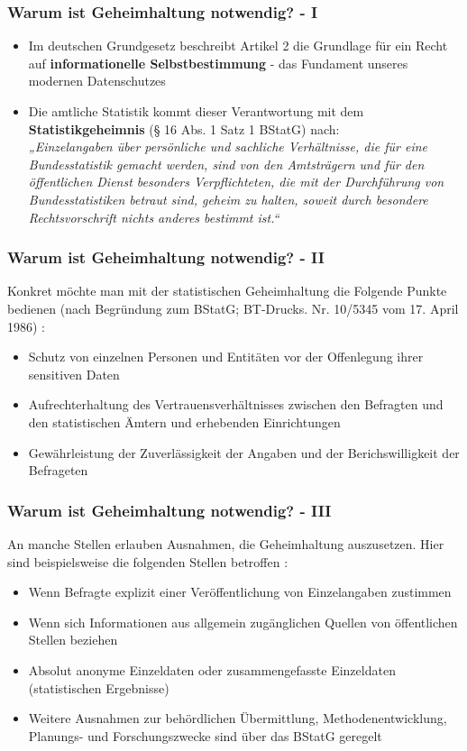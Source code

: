 \documentclass[aspectratio=169]{beamer}
\begin{document}
\begin{frame}{}
    \frametitle{Warum ist Geheimhaltung notwendig? - I}
    \begin{itemize}
        \item Im deutschen Grundgesetz beschreibt Artikel 2 die Grundlage für ein Recht auf \textbf{informationelle Selbstbestimmung} - das Fundament unseres modernen Datenschutzes
        \item Die amtliche Statistik kommt dieser Verantwortung mit dem \textbf{Statistikgeheimnis} (§ 16 Abs. 1 Satz 1 BStatG) nach: \\
        \textit{„Einzelangaben über persönliche und sachliche Verhältnisse, die für eine Bundesstatistik
        gemacht werden, sind von den Amtsträgern und für den öffentlichen Dienst besonders
        Verpflichteten, die mit der Durchführung von Bundesstatistiken betraut sind, geheim zu halten,
        soweit durch besondere Rechtsvorschrift nichts anderes bestimmt ist.“}
    \end{itemize}
\end{frame}


\begin{frame}{}
    \frametitle{Warum ist Geheimhaltung notwendig? - II}
    Konkret möchte man mit der statistischen Geheimhaltung die Folgende Punkte bedienen (nach Begründung zum BStatG; BT-Drucks. Nr. 10/5345 vom 17. April 1986) \cite{Nickl}:
    \begin{itemize}
        \item Schutz von einzelnen Personen und Entitäten vor der Offenlegung ihrer sensitiven Daten
        \item Aufrechterhaltung des Vertrauensverhältnisses zwischen den Befragten und den statistischen Ämtern und erhebenden Einrichtungen
        \item Gewährleistung der Zuverlässigkeit der Angaben und der Berichswilligkeit der Befrageten
    \end{itemize}
\end{frame}


\begin{frame}{}
    \frametitle{Warum ist Geheimhaltung notwendig? - III}
    An manche Stellen erlauben Ausnahmen, die Geheimhaltung auszusetzen. Hier sind beispielsweise die folgenden Stellen betroffen \cite{Nickl}:
    \begin{itemize}
        \item Wenn Befragte explizit einer Veröffentlichung von Einzelangaben zustimmen
        \item Wenn sich Informationen aus allgemein zugänglichen Quellen von öffentlichen Stellen beziehen
        \item Absolut anonyme Einzeldaten oder zusammengefasste Einzeldaten (statistischen Ergebnisse)
        \item Weitere Ausnahmen zur behördlichen Übermittlung, Methodenentwicklung, Planungs- und Forschungszwecke sind über das BStatG geregelt
    \end{itemize}
\end{frame}
\end{document}

